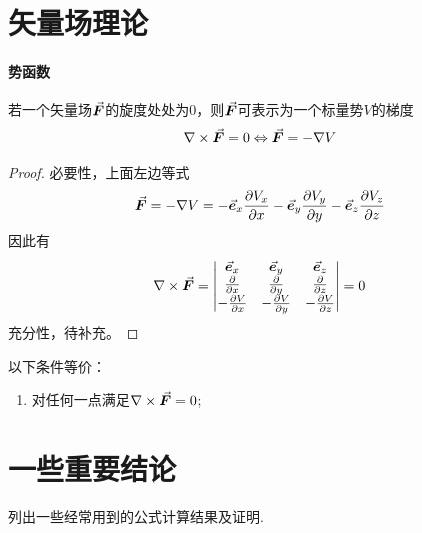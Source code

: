 \section{矢量场理论}
\paragraph{势函数}
若一个矢量场$\vec{\bm{F}}$的旋度处处为0，则$\vec{\bm{F}}$可表示为一个标量势$V$的梯度
\begin{equation}
    \nabla \times \vec{\bm{F}} = 0 \Leftrightarrow \vec{\bm{F}} = -\nabla V
    \label{eq:scalar-poten}
\end{equation}
\begin{proof}
    必要性，上面左边等式
    \begin{equation*}
        \vec{\bm{F}} = - \nabla V = -\vec{\bm{e}}_x \frac{\partial V_x}{\partial x}
                            -\vec{\bm{e}}_y \frac{\partial V_y}{\partial y}
                            -\vec{\bm{e}}_z \frac{\partial V_z}{\partial z}
    \end{equation*}
    因此有
    \begin{equation*}
        \nabla \times \vec{\bm{F}} = \left|\begin{matrix}
            \vec{\bm{e}}_x  &   \vec{\bm{e}}_y  &   \vec{\bm{e}}_z  \\
            \frac{\partial}{\partial x} & \frac{\partial}{\partial y} & \frac{\partial}{\partial z} \\
            -\frac{\partial V}{\partial x} & -\frac{\partial V}{\partial y} & -\frac{\partial V}{\partial z}
        \end{matrix}\right|
        = 0
    \end{equation*}
    充分性，待补充。
\end{proof}

\begin{theorem}[无旋场]
    以下条件等价：
    \begin{enumerate}
        \item 对任何一点满足$\nabla \times \vec{\bm{F}} = 0$;
    \end{enumerate}
\end{theorem}

\section{一些重要结论}
列出一些经常用到的公式计算结果及证明.